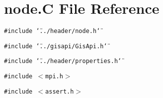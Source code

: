 \hypertarget{node_8C}{
\section{node.C File Reference}
\label{node_8C}
}
{\tt \#include \char`\"{}../header/node.h\char`\"{}}\par
{\tt \#include \char`\"{}../gisapi/Gis\-Api.h\char`\"{}}\par
{\tt \#include \char`\"{}../header/properties.h\char`\"{}}\par
{\tt \#include $<$mpi.h$>$}\par
{\tt \#include $<$assert.h$>$}\par
